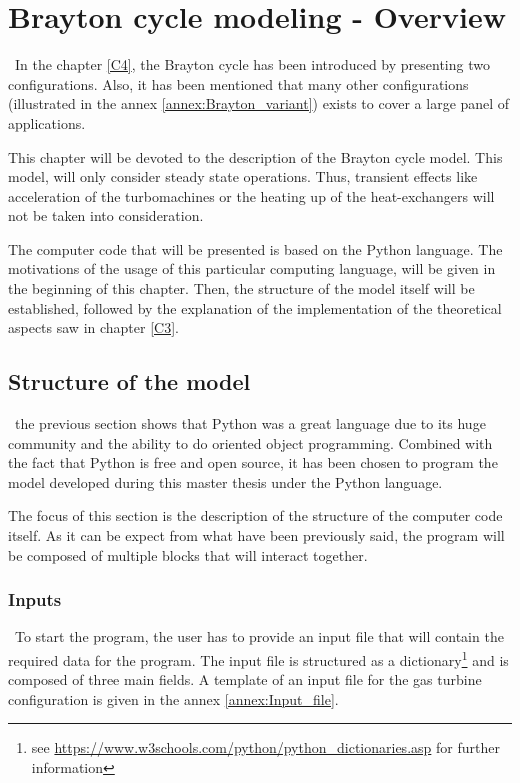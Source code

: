 \graphicspath{{Chapter_5_-_Code_structure/Images/}}
\chapter{Brayton cycle modeling - Overview}\label{C5}
\quad\, In the chapter \ref{C4}, the Brayton cycle has been introduced by presenting two configurations. Also, it has been mentioned that many other configurations (illustrated in the annex \ref{annex:Brayton_variant}) exists to cover a large panel of applications. 

This chapter will be devoted to the description of the  Brayton cycle model. This model, will only consider steady state operations. Thus, transient effects like acceleration of the turbomachines or the heating up of the heat-exchangers will not be taken into consideration.

The computer code that will be presented is based on the Python language\citep{van1995python}. The motivations of the usage of this particular computing language, will be given in the beginning of this chapter. Then, the structure of the model itself will be established, followed by the explanation of the implementation of the theoretical aspects saw in chapter \ref{C3}.



\section{Structure of the model}
\quad\, the previous section shows that Python was a great language due to its huge community and the ability to do oriented object programming. Combined with the fact that Python is free and open source, it has been chosen to program the model developed during this master thesis under the Python language.

The focus of this section is the description of the structure of the computer code itself. As it can be expect from what have been previously said, the program will be composed of multiple blocks that will interact together.

\subsection{Inputs}
\quad\, To start the program, the user has to provide an input file that will contain the required data for the program. The input file is structured as a dictionary\footnote{see \url{https://www.w3schools.com/python/python_dictionaries.asp} for further information} and is composed of three main fields. A template of an input file for the gas turbine configuration is given in the annex \ref{annex:Input_file}.

